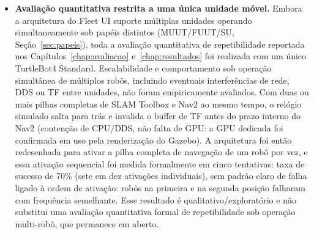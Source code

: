 \begin{itemize}
    \item \textbf{Avaliação quantitativa restrita a uma única unidade móvel.}
    Embora a arquitetura do Fleet UI suporte múltiplas unidades operando
    simultaneamente sob papéis distintos (MUUT/FUUT/SU, Seção~\ref{sec:papeis}),
    toda a avaliação quantitativa de repetibilidade reportada nos
    Capítulos~\ref{chap:avaliacao} e~\ref{chap:resultados} foi realizada com um
    único TurtleBot4 Standard. Escalabilidade e comportamento sob operação
    simultânea de múltiplos robôs, incluindo eventuais interferências de
    rede, DDS ou TF entre unidades, não foram empiricamente avaliados. Com
    duas ou mais pilhas completas de SLAM Toolbox e Nav2 ao mesmo tempo, o
    relógio simulado salta para trás e invalida o buffer de TF antes do
    prazo interno do Nav2 (contenção de CPU/DDS, não falta de GPU: a GPU
    dedicada foi confirmada em uso pela renderização do Gazebo). A
    arquitetura foi então redesenhada para ativar a pilha completa de
    navegação de um robô por vez, e essa ativação sequencial foi medida
    formalmente em cinco tentativas: taxa de sucesso de 70\% (sete em dez
    ativações individuais), sem padrão claro de falha ligado à ordem de
    ativação: robôs na primeira e na segunda posição falharam com
    frequência semelhante. Esse resultado é qualitativo/exploratório e não
    substitui uma avaliação quantitativa formal de repetibilidade sob
    operação multi-robô, que permanece em aberto.


\end{itemize}
